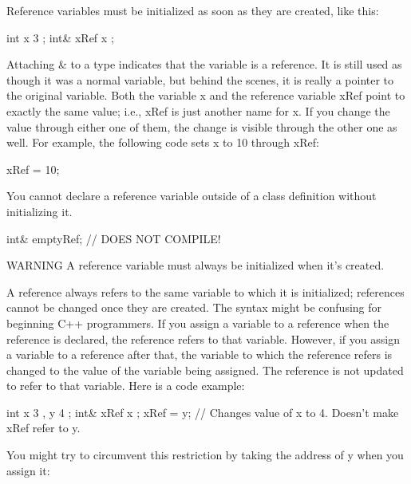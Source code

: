 
Reference variables must be initialized as soon as they are created, like this:

\begin{cpp}
int x { 3 };
int& xRef { x };
\end{cpp}

Attaching \& to a type indicates that the variable is a reference. It is still used as though it was a normal variable, but behind the scenes, it is really a pointer to the original variable. Both the variable x and the reference variable xRef point to exactly the same value; i.e., xRef is just another name for x. If you change the value through either one of them, the change is visible through the other one as well. For example, the following code sets x to 10 through xRef:

\begin{cpp}
xRef = 10;
\end{cpp}

You cannot declare a reference variable outside of a class definition without initializing it.

\begin{cpp}
int& emptyRef; // DOES NOT COMPILE!
\end{cpp}

\begin{myWarning}{WARNING}
A reference variable must always be initialized when it’s created.
\end{myWarning}


A reference always refers to the same variable to which it is initialized; references cannot be changed once they are created. The syntax might be confusing for beginning C++ programmers. If you assign a variable to a reference when the reference is declared, the reference refers to that variable. However, if you assign a variable to a reference after that, the variable to which the reference refers is changed to the value of the variable being assigned. The reference is not updated to refer to that variable. Here is a code example:

\begin{cpp}
int x { 3 }, y { 4 };
int& xRef { x };
xRef = y; // Changes value of x to 4. Doesn't make xRef refer to y.
\end{cpp}

You might try to circumvent this restriction by taking the address of y when you assign it:

